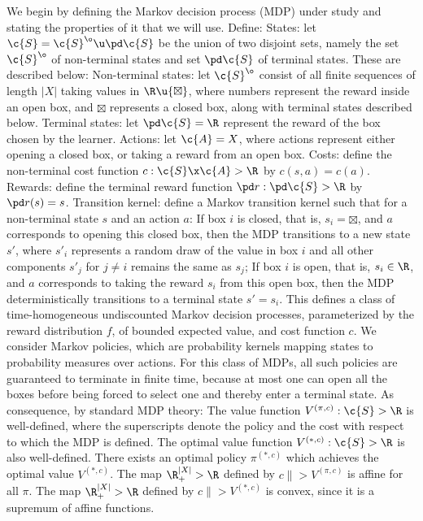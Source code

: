 \documentclass{article}
\begin{document}
We begin by defining the Markov decision process (MDP) under study and stating the properties of it that we will use.
Define:
\1 States: let $\c{S} = \c{S}^{\o} \u \pd\c{S}$ be the union of two disjoint sets, namely the set $\c{S}^{\o}$ of non-terminal states and set $\pd\c{S}$ of terminal states. These are described below:
\1 Non-terminal states: let $\c{S}^{\o}$ consist of all finite sequences of length $|X|$ taking values in $\R\u\{\boxtimes\}$, where numbers represent the reward inside an open box, and $\boxtimes$ represents a closed box, along with terminal states described below.
\2 Terminal states: let $\pd\c{S} = \R$ represent the reward of the box chosen by the learner.
\0
\2 Actions: let $\c{A} = X$, where actions represent either opening a closed box, or taking a reward from an open box.
\3 Costs: define the non-terminal cost function $c : \c{S} \x \c{A} \-> \R$ by $c(s,a) = c(a)$.
\4 Rewards: define the terminal reward function $\pd r : \pd\c{S} \-> \R$ by $\pd r(s) = s$.
\4 Transition kernel: define a Markov transition kernel such that for a non-terminal state $s$ and an action $a$:
\1 If box $i$ is closed, that is, $s_i=\boxtimes$, and $a$ corresponds to opening this closed box, then the MDP transitions to a new state $s'$, where $s'_i$ represents a random draw of the value in box $i$ and all other components $s'_j$ for $j\neq i$ remains the same as $s_j$;
\2 If box $i$ is open, that is, $s_i\in\R$, and $a$ corresponds to taking the reward $s_i$ from this open box, then the MDP deterministically transitions to a terminal state $s'=s_i$.
\0
\0 
This defines a class of time-homogeneous undiscounted Markov decision processes, parameterized by the reward distribution $f$, of bounded expected value, and cost function $c$.
We consider Markov policies, which are probability kernels mapping states to probability measures over actions.
For this class of MDPs, all such policies are guaranteed to terminate in finite time, because at most one can open all the boxes before being forced to select one and thereby enter a terminal state.
As consequence, by standard MDP theory:
\1 The value function $V^{(\pi,c)} : \c{S} \-> \R$ is well-defined, where the superscripts denote the policy and the cost with respect to which the MDP is defined.
\2 The optimal value function $V^{(*,c)} : \c{S} \-> \R$ is also well-defined.
\3 There exists an optimal policy $\pi^{(*,c)}$ which achieves the optimal value $V^{(*,c)}$.
\4 The map $\R_+^{|X|} \-> \R$ defined by $c \|> V^{(\pi,c)}$ is affine for all $\pi$.
\5 The map $\R_+^{|X|} \-> \R$ defined by $c \|> V^{(*,c)}$ is convex, since it is a supremum of affine functions.
\end{document}
